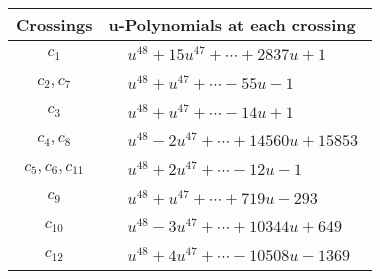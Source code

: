 \documentclass[1p]{elsarticle_modified}
\theoremstyle{definition}
\begin{document}
\begin{tabular}{m{50pt}|m{274pt}}
Crossings & \hspace{64pt}u-Polynomials at each crossing \\
\hline $$\begin{aligned}c_{1}\end{aligned}$$&$\begin{aligned}
&u^{48}+15 u^{47}+\cdots+2837 u+1
\end{aligned}$\\
\hline $$\begin{aligned}c_{2},c_{7}\end{aligned}$$&$\begin{aligned}
&u^{48}+u^{47}+\cdots-55 u-1
\end{aligned}$\\
\hline $$\begin{aligned}c_{3}\end{aligned}$$&$\begin{aligned}
&u^{48}+u^{47}+\cdots-14 u+1
\end{aligned}$\\
\hline $$\begin{aligned}c_{4},c_{8}\end{aligned}$$&$\begin{aligned}
&u^{48}-2 u^{47}+\cdots+14560 u+15853
\end{aligned}$\\
\hline $$\begin{aligned}c_{5},c_{6},c_{11}\end{aligned}$$&$\begin{aligned}
&u^{48}+2 u^{47}+\cdots-12 u-1
\end{aligned}$\\
\hline $$\begin{aligned}c_{9}\end{aligned}$$&$\begin{aligned}
&u^{48}+u^{47}+\cdots+719 u-293
\end{aligned}$\\
\hline $$\begin{aligned}c_{10}\end{aligned}$$&$\begin{aligned}
&u^{48}-3 u^{47}+\cdots+10344 u+649
\end{aligned}$\\
\hline $$\begin{aligned}c_{12}\end{aligned}$$&$\begin{aligned}
&u^{48}+4 u^{47}+\cdots-10508 u-1369
\end{aligned}$\\
\hline
\end{tabular}\\~\\
\end{document}
